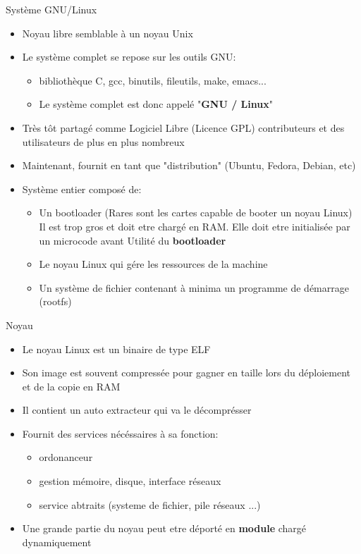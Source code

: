 \begin{frame}{Système GNU/Linux}{}
  \begin{itemize}
  \item Noyau libre semblable à un noyau Unix
  \item Le système complet se repose sur les outils GNU:
    \begin{itemize}
    \item bibliothèque C, gcc, binutils, fileutils, make, emacs...
    \item Le système complet est donc appelé "\textbf{GNU / Linux}"
    \end{itemize}
  \item Très tôt partagé comme Logiciel Libre (Licence GPL) \MVRightarrow contributeurs et des utilisateurs de plus en plus nombreux
  \item Maintenant, fournit en tant que "distribution" (Ubuntu, Fedora, Debian, etc)
  \item Système entier composé de:
    \begin{itemize}
    \item Un bootloader (Rares sont les cartes capable de booter un noyau Linux)\\
      Il est trop gros et doit etre chargé en RAM. Elle doit etre initialisée par un microcode avant \MVRightarrow{} Utilité du \textbf{bootloader}
    \item Le noyau Linux qui gére les ressources de la machine
    \item Un système de fichier contenant à minima un programme de démarrage (rootfs)
    \end{itemize}
  \end{itemize}
\end{frame}

\begin{frame}{Noyau}{}
  \begin{itemize}
  \item Le noyau Linux est un binaire de type ELF
  \item Son image est souvent compressée pour gagner en taille lors du déploiement et de la copie en RAM
  \item Il contient un auto extracteur qui va le décomprésser
  \item Fournit des services nécéssaires à sa fonction:
    \begin{itemize}
    \item ordonanceur
    \item gestion mémoire, disque, interface réseaux
    \item service abtraits (systeme de fichier, pile réseaux ...)
    \end{itemize}
  \item Une grande partie du noyau peut etre déporté en \textbf{module} chargé dynamiquement
  \end{itemize}
\end{frame}

